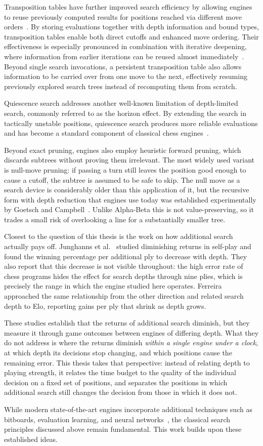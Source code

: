 Transposition tables have further improved search efficiency by allowing engines
to reuse previously computed results for positions reached via different move
orders~\cite{zobrist1970hashing}. By storing evaluations together with depth
information and bound types, transposition tables enable both direct cutoffs and
enhanced move ordering. Their effectiveness is especially pronounced in
combination with iterative deepening, where information from earlier iterations
can be reused almost immediately~\cite{warnock1988search}. Beyond single search
invocations, a persistent transposition table also allows information to be
carried over from one move to the next, effectively resuming previously
explored search trees instead of recomputing them from scratch.

Quiescence search addresses another well-known limitation of depth-limited
search, commonly referred to as the horizon effect. By extending the search in
tactically unstable positions, quiescence search produces more reliable
evaluations and has become a standard component of classical chess
engines~\cite{marsland1986review}.

Beyond exact pruning, engines also employ heuristic forward pruning, which
discards subtrees without proving them irrelevant. The most widely used variant
is null-move pruning: if passing a turn still leaves the position good enough to
cause a cutoff, the subtree is assumed to be safe to skip. The null move as a
search device is considerably older than this application of it, but the
recursive form with depth reduction that engines use today was established
experimentally by Goetsch and Campbell~\cite{goetsch1990experiments}. Unlike
Alpha-Beta this is not value-preserving, so it trades a small risk of overlooking
a line for a substantially smaller tree.

Closest to the question of this thesis is the work on how additional search
actually pays off. Junghanns et al.~\cite{junghanns1997diminishing} studied
diminishing returns in self-play and found the winning percentage per additional
ply to decrease with depth. They also report that this decrease is not visible
throughout: the high error rate of chess programs hides the effect for search
depths through nine plies, which is precisely the range in which the engine
studied here operates. Ferreira~\cite{ferreira2013impact} approached the
same relationship from the other direction and related search depth to Elo,
reporting gains per ply that shrink as depth grows.

These studies establish that the returns of additional search diminish, but they
measure it through game outcomes between engines of differing depth. What they do
not address is where the returns diminish \emph{within a single engine under a
clock}, at which depth its decisions stop changing, and which positions cause the
remaining error. This thesis takes that perspective: instead of relating depth to
playing strength, it relates the time budget to the quality of the individual
decision on a fixed set of positions, and separates the positions in which
additional search still changes the decision from those in which it does not.

While modern state-of-the-art engines incorporate additional techniques such as
bitboards, evaluation learning, and neural networks~\cite{silver2018alphazero},
the classical search principles discussed above remain fundamental. This work
builds upon these established ideas.